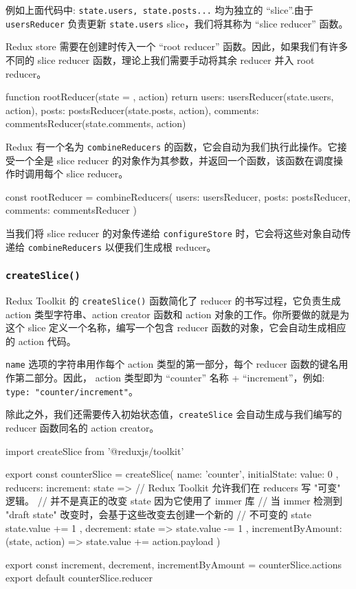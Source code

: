 例如上面代码中: \texttt{state.users, state.posts...} 均为独立的 ``slice''.由于 \texttt{usersReducer} 负责更新 \texttt{state.users} slice，我们将其称为 “slice reducer” 函数。

Redux store 需要在创建时传入一个 “root reducer” 函数。因此，如果我们有许多不同的 slice reducer 函数，理论上我们需要手动将其余 reducer 并入 root reducer。

\begin{JavaScript}
function rootReducer(state = {}, action) {
  return {
    users: usersReducer(state.users, action),
    posts: postsReducer(state.posts, action),
    comments: commentsReducer(state.comments, action)
  }
}
\end{JavaScript}

Redux 有一个名为 \texttt{combineReducers} 的函数，它会自动为我们执行此操作。它接受一个全是 slice reducer 的对象作为其参数，并返回一个函数，该函数在调度操作时调用每个 slice reducer。

\begin{JavaScript}
const rootReducer = combineReducers({
  users: usersReducer,
  posts: postsReducer,
  comments: commentsReducer
})
\end{JavaScript}

当我们将 slice reducer 的对象传递给 \texttt{configureStore} 时，它会将这些对象自动传递给 \texttt{combineReducers} 以便我们生成根 reducer。

\subsubsection*{\texttt{createSlice()}}

Redux Toolkit 的 \texttt{createSlice()} 函数简化了 reducer 的书写过程，它负责生成 action 类型字符串、action creator 函数和 action 对象的工作。你所要做的就是为这个 slice 定义一个名称，编写一个包含 reducer 函数的对象，它会自动生成相应的 action 代码。

\texttt{name} 选项的字符串用作每个 action 类型的第一部分，每个 reducer 函数的键名用作第二部分。因此， action 类型即为 ``counter'' 名称 + ``increment''，例如: \texttt{{type: "counter/increment"}}。

除此之外，我们还需要传入初始状态值，\texttt{createSlice} 会自动生成与我们编写的 reducer 函数同名的 action creator。

\begin{JavaScript}
import { createSlice } from '@reduxjs/toolkit'

export const counterSlice = createSlice({
  name: 'counter',
  initialState: {
    value: 0
  },
  reducers: {
    increment: state => {
      // Redux Toolkit 允许我们在 reducers 写 "可变" 逻辑。
      // 并不是真正的改变 state 因为它使用了 immer 库
      // 当 immer 检测到 "draft state" 改变时，会基于这些改变去创建一个新的
      // 不可变的 state
      state.value += 1
    },
    decrement: state => {
      state.value -= 1
    },
    incrementByAmount: (state, action) => {
      state.value += action.payload
    }
  }
})

export const { increment, decrement, incrementByAmount } = counterSlice.actions
export default counterSlice.reducer
\end{JavaScript}

